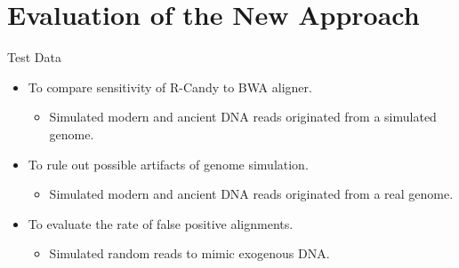 \documentclass{beamer}
\begin{document}


\section{Evaluation of the New Approach}
\begin{frame}{Test Data }
	\begin{itemize}
		\item To compare sensitivity of R-Candy to BWA aligner.
			\begin{itemize}
				\item Simulated modern and ancient DNA reads originated from a simulated genome.
			\end{itemize}	
		\item To rule out possible artifacts of genome simulation.
			\begin{itemize}
				\item Simulated modern and ancient DNA reads originated from a real genome.
			\end{itemize}
		\item To evaluate the rate of false positive alignments.
			\begin{itemize}
				\item Simulated random reads to mimic exogenous DNA.
			\end{itemize}
	\end{itemize}
\end{frame}


\end{document}
